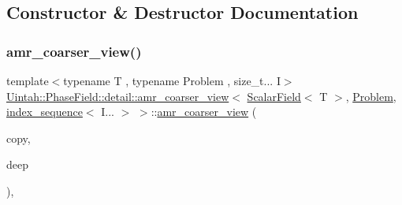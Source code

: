 \subsection{Constructor \& Destructor Documentation}
\mbox{\label{classUintah_1_1PhaseField_1_1detail_1_1amr__coarser__view_3_01ScalarField_3_01T_01_4_00_01Proble9cadea116dab5bdb44bb3e29abbe99ef_a01447da34e14e479a121699cd8f4d6a2}} 
\subsubsection{\texorpdfstring{amr\+\_\+coarser\+\_\+view()}{amr\_coarser\_view()}\hspace{0.1cm}{\footnotesize\ttfamily [1/4]}}
{\footnotesize\ttfamily template$<$typename T , typename Problem , size\+\_\+t... I$>$ \\
\hyperlink{classUintah_1_1PhaseField_1_1detail_1_1amr__coarser__view}{Uintah\+::\+Phase\+Field\+::detail\+::amr\+\_\+coarser\+\_\+view}$<$ \hyperlink{structUintah_1_1PhaseField_1_1ScalarField}{Scalar\+Field}$<$ T $>$, \hyperlink{classUintah_1_1PhaseField_1_1Problem}{Problem}, \hyperlink{namespaceUintah_1_1PhaseField_a237de804d99512e50613aff7c94a9461}{index\+\_\+sequence}$<$ I... $>$ $>$\+::\hyperlink{classUintah_1_1PhaseField_1_1detail_1_1amr__coarser__view}{amr\+\_\+coarser\+\_\+view} (\begin{DoxyParamCaption}\item[{const \hyperlink{classUintah_1_1PhaseField_1_1detail_1_1amr__coarser__view}{amr\+\_\+coarser\+\_\+view}$<$ \hyperlink{structUintah_1_1PhaseField_1_1ScalarField}{Scalar\+Field}$<$ T $>$, \hyperlink{classUintah_1_1PhaseField_1_1Problem}{Problem}, \hyperlink{namespaceUintah_1_1PhaseField_a237de804d99512e50613aff7c94a9461}{index\+\_\+sequence}$<$ I... $>$ $>$ $\ast$}]{copy,  }\item[{bool}]{deep }\end{DoxyParamCaption})\hspace{0.3cm}{\ttfamily [inline]}, {\ttfamily [protected]}}



